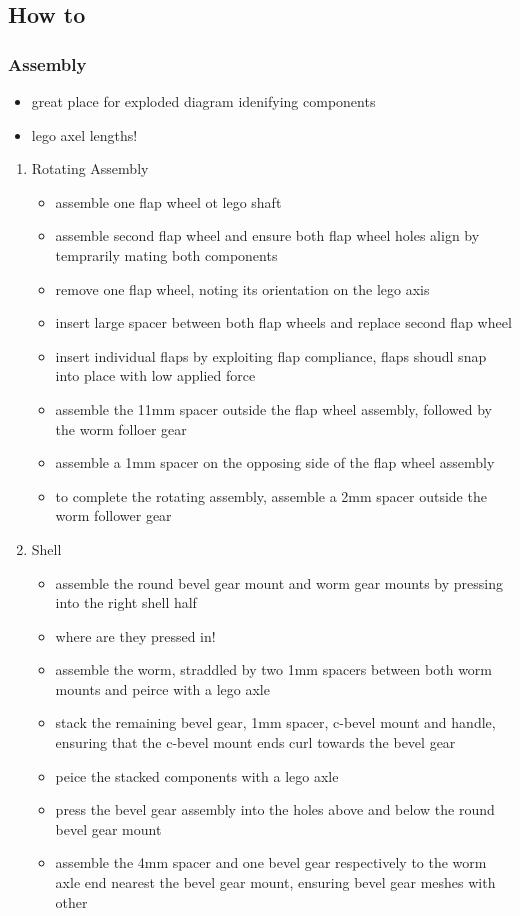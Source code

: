 \documentclass[11pt]{article}
\begin{document}
\subsection{How to}
\label{sec:org0c80dba}

\subsubsection{Assembly}
\label{sec:orgdaad11d}
\begin{itemize}
\item great place for exploded diagram idenifying components
\item lego axel lengths!
\end{itemize}

\begin{enumerate}
\item Rotating Assembly
\label{sec:orgeadf4bb}
\begin{itemize}
\item assemble one flap wheel ot lego shaft
\item assemble second flap wheel and ensure both flap wheel holes align by temprarily mating both components
\item remove one flap wheel, noting its orientation on the lego axis
\item insert large spacer between both flap wheels and replace second flap wheel
\item insert individual flaps by exploiting flap compliance, flaps shoudl snap into place with low applied force
\item assemble the 11mm spacer outside the flap wheel assembly, followed by the worm folloer gear
\item assemble a 1mm spacer on the opposing side of the flap wheel assembly
\item to complete the rotating assembly, assemble a 2mm spacer outside the worm follower gear
\end{itemize}

\item Shell
\label{sec:org2cd8040}
\begin{itemize}
\item assemble the round bevel gear mount and worm gear mounts by pressing into the right shell half
\item where are they pressed in!
\item assemble the worm, straddled by two 1mm spacers between both worm mounts and peirce with a lego axle
\item stack the remaining bevel gear, 1mm spacer, c-bevel mount and handle, ensuring that the c-bevel mount ends curl towards the bevel gear
\item peice the stacked components with a lego axle
\item press the bevel gear assembly into the holes above and below the round bevel gear mount
\item assemble the 4mm spacer and one bevel gear respectively to the worm axle end nearest the bevel gear mount, ensuring bevel gear meshes with other
\end{itemize}


\end{enumerate}
\end{document}

